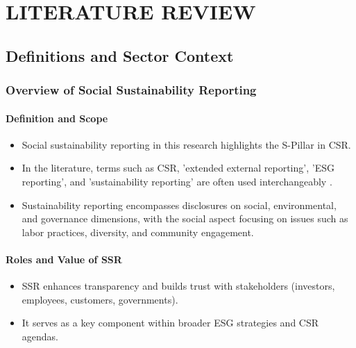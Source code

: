 \chapter{LITERATURE REVIEW}

\section{Definitions and Sector Context}

\subsection{Overview of Social Sustainability Reporting}

\subsubsection{Definition and Scope}
\begin{itemize}
    \item Social sustainability reporting in this research highlights the S-Pillar in CSR. 
    \item In the literature, terms such as CSR, 'extended external reporting', 'ESG reporting', and 
    'sustainability reporting' are often used interchangeably \parencite{Edge2022, Fiechter2022}. 
    \item Sustainability reporting encompasses disclosures on social, environmental, and governance dimensions, 
    with the social aspect focusing on issues such as labor practices, diversity, and community engagement.
\end{itemize}

\subsubsection{Roles and Value of SSR}
\begin{itemize}
    \item SSR enhances transparency and builds trust with stakeholders (investors, employees, customers, governments). 
    \item It serves as a key component within broader ESG strategies and CSR agendas.
\end{itemize}

